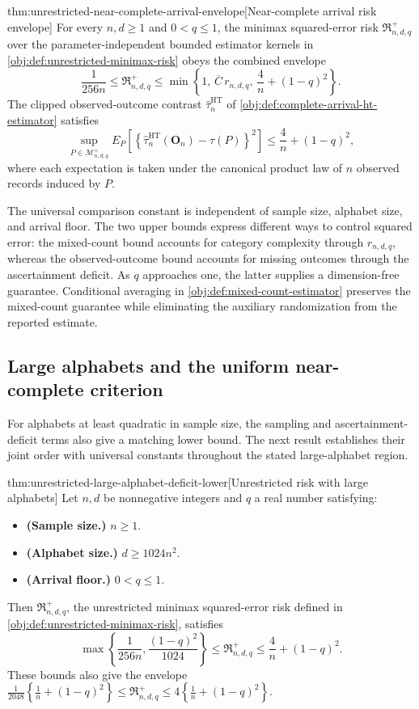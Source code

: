 \documentclass[11pt]{article}
\begin{document}
\begin{theoremv}{thm:unrestricted-near-complete-arrival-envelope}[Near-complete arrival risk envelope]
For every \(n,d\ge1\) and \(0<q\le1\), the minimax squared-error risk \(\mathfrak R^{+}_{n,d,q}\) over the parameter-independent bounded estimator kernels in \cref{obj:def:unrestricted-minimax-risk} obeys the combined envelope
\[
\frac{1}{256n}
\le
\mathfrak R^{+}_{n,d,q}
\le
\min\left\{
1,\,
\overline C\,r_{n,d,q},\,
\frac4n+(1-q)^2
\right\}.
\]
The clipped observed-outcome contrast \(\widehat\tau^{\mathrm{HT}}_n\) of \cref{obj:def:complete-arrival-ht-estimator} satisfies
\[
\sup_{P\in\mathcal M^{+}_{n,d,q}}
E_P\!\left[
\left\{
\widehat\tau^{\mathrm{HT}}_n(\mathbf O_n)-\tau(P)
\right\}^{2}
\right]
\le
\frac4n+(1-q)^2,
\]
where each expectation is taken under the canonical product law of \(n\) observed records induced by \(P\).
\end{theoremv}

The universal comparison constant  is independent of sample size, alphabet size, and arrival floor. The two upper bounds express different ways to control squared error: the mixed-count bound accounts for category complexity through \(r_{n,d,q}\), whereas the observed-outcome bound accounts for missing outcomes through the ascertainment deficit. As \(q\) approaches one, the latter supplies a dimension-free guarantee. Conditional averaging in \cref{obj:def:mixed-count-estimator} preserves the mixed-count guarantee while eliminating the auxiliary randomization from the reported estimate.

\subsection{Large alphabets and the uniform near-complete criterion}

For alphabets at least quadratic in sample size, the sampling and ascertainment-deficit terms also give a matching lower bound. The next result establishes their joint order with universal constants throughout the stated large-alphabet region.

\begin{theoremv}{thm:unrestricted-large-alphabet-deficit-lower}[Unrestricted risk with large alphabets]
Let \(n,d\) be nonnegative integers and \(q\) a real number satisfying:
\begin{itemize}
\item \textbf{(Sample size.)} \(n\ge 1\).
\item \textbf{(Alphabet size.)} \(d\ge 1024n^2\).
\item \textbf{(Arrival floor.)} \(0<q\le 1\).
\end{itemize}
Then \(\mathfrak R^{+}_{n,d,q}\), the unrestricted minimax squared-error risk defined in \cref{obj:def:unrestricted-minimax-risk}, satisfies
\[
\max\left\{\frac{1}{256n},\frac{(1-q)^2}{1024}\right\}
\le \mathfrak R^{+}_{n,d,q}
\le \frac{4}{n}+(1-q)^2.
\]
These bounds also give the envelope
\(\frac{1}{2048}\left\{\frac{1}{n}+(1-q)^2\right\}
\le \mathfrak R^{+}_{n,d,q}
\le 4\left\{\frac{1}{n}+(1-q)^2\right\}\).
\end{theoremv}
\end{document}
